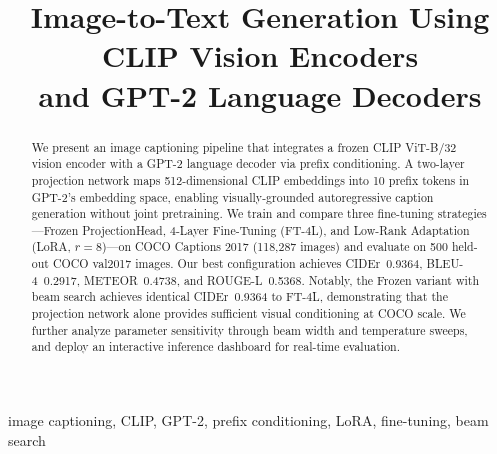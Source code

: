 \documentclass[conference]{IEEEtran}
\begin{document}
\title{Image-to-Text Generation Using CLIP Vision Encoders\\
and GPT-2 Language Decoders}

\author{
\and
{}
\and
{}
}

\maketitle

\begin{abstract}
We present an image captioning pipeline that integrates a frozen CLIP ViT-B/32 vision encoder with a GPT-2 language decoder via prefix conditioning. A two-layer projection network maps 512-dimensional CLIP embeddings into 10 prefix tokens in GPT-2's embedding space, enabling visually-grounded autoregressive caption generation without joint pretraining. We train and compare three fine-tuning strategies---Frozen ProjectionHead, 4-Layer Fine-Tuning (FT-4L), and Low-Rank Adaptation (LoRA, $r=8$)---on COCO Captions 2017 (118,287 images) and evaluate on 500 held-out COCO val2017 images. Our best configuration achieves CIDEr~0.9364, BLEU-4~0.2917, METEOR~0.4738, and ROUGE-L~0.5368. Notably, the Frozen variant with beam search achieves identical CIDEr~0.9364 to FT-4L, demonstrating that the projection network alone provides sufficient visual conditioning at COCO scale. We further analyze parameter sensitivity through beam width and temperature sweeps, and deploy an interactive inference dashboard for real-time evaluation.
\end{abstract}

\begin{IEEEkeywords}
image captioning, CLIP, GPT-2, prefix conditioning, LoRA, fine-tuning, beam search
\end{IEEEkeywords}
\end{document}
